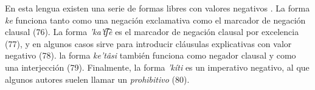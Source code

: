 En esta lengua existen una serie de formas libres con valores negativos \textcolor{MidnightBlue}{\citep{tarahumara}}. La forma {\setmainfont{Charis SIL} \textit{ke}} funciona tanto como una negación exclamativa como el marcador de negación clausal (76). La forma {\setmainfont{Charis SIL} \textit{'ka't͡ʃè}} es el marcador de negación clausal por excelencia (77), y en algunos casos sirve para introducir cláusulas explicativas con valor negativo (78). la forma {\setmainfont{Charis SIL} \textit{ke'tâsi}} también funciona como negador clausal y como una interjección (79). Finalmente, la forma {\setmainfont{Charis SIL} \textit{'kíti}} es un imperativo negativo, al que algunos autores suelen llamar un \textit{prohibitivo} (80).